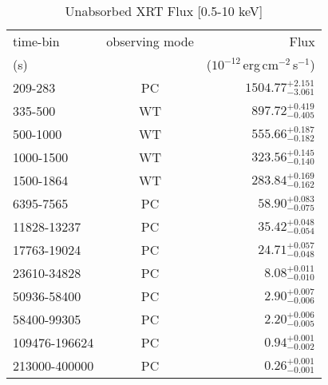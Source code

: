 \documentclass{naturesubmissionstyle}
\begin{document}
\begin{table}
\centering
\begin{tabular}{lcr}
time-bin	&	observing mode 		&  Flux	\\
(s)	&	 		&    ($10^{-12}$\,erg\,cm$^{-2}$\,s$^{-1}$) 	\\
\hline	
209-283& PC & $1504.77_{-3.061}^{+2.151}$\\ 
335-500& WT & $897.72_{-0.405}^{+0.419}$\\ 
500-1000& WT & $555.66_{-0.182}^{+0.187}$\\ 
1000-1500& WT & $323.56_{-0.140}^{+0.145}$\\ 
1500-1864& WT & $283.84_{-0.162}^{+0.169}$\\ 
6395-7565& PC & $58.90_{-0.075}^{+0.083}$\\ 
11828-13237& PC & $35.42_{-0.054}^{+0.048}$\\ 
17763-19024& PC & $24.71_{-0.048}^{+0.057}$\\ 
23610-34828& PC & $8.08_{-0.010}^{+0.011}$\\ 
50936-58400& PC & $2.90_{-0.006}^{+0.007}$\\ 
58400-99305& PC & $2.20_{-0.005}^{+0.006}$\\ 
109476-196624& PC & $0.94_{-0.002}^{+0.001}$\\ 
213000-400000& PC & $0.26_{-0.001}^{+0.001}$\\ 
\hline	

\end{tabular}
\caption{Unabsorbed XRT Flux [0.5-10 keV]}
\label{xrt_tab}
\end{table}
\end{document}
